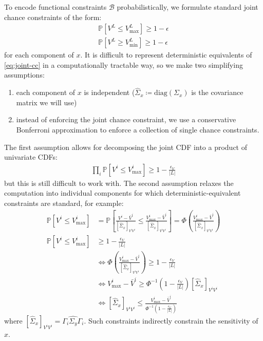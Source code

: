 To encode functional constraints $\mathcal{B}$ probabilistically, we formulate standard joint chance constraints of the form:
\begin{align}
\label{eq:joint-cc}
\mathbb{P}\left[ V^L \leq V_{\max}^L \right] \geq 1-\epsilon \\
\mathbb{P}\left[ V^L \geq V_{\min}^L \right] \geq 1-\epsilon
\end{align}
for each component of $x$.
It is difficult to represent deterministic equivalents of \cref{eq:joint-cc} in a computationally tractable way, so we make two simplifying assumptions:
\begin{enumerate}
	\item each component of $x$ is independent ($\hat{\Sigma}_x \coloneqq \text{diag}\left( \Sigma_x \right)$ is the covariance matrix we will use)
	\item instead of enforcing the joint chance constraint, we use a conservative Bonferroni approximation to enforce a collection of single chance constraints.
\end{enumerate}
The first assumption allows for decomposing the joint CDF into a product of univariate CDFs:
\begin{align}
\prod_{i} \mathbb{P} \left[ V^i \leq V_{\max}^i \right]  \geq 1 - \frac{\epsilon_V}{|L|}
\end{align}
but this is still difficult to work with.
The second assumption relaxes the computation into individual components for which deterministic-equivalent constraints are standard, for example:
\begin{subequations}
\label{eq:de}
\begin{align}
\mathbb{P} \left[ V^i \leq V_{\max}^i  \right] &= \mathbb{P} \left[ \frac{V^i - \bar{V}^i}{[\hat{\Sigma}_x]_{V^iV^i}} \leq \frac{V_{\max}^i - \bar{V}^i}{[\hat{\Sigma}_x]_{V^iV^i}} \right] = \Phi \left( \frac{V_{\max}^i - \bar{V}^i}{[\hat{\Sigma}_x]_{V^iV^i}} \right) \\
\mathbb{P} \left[ V^i \leq V_{\max}^i  \right] &\geq 1 - \frac{\epsilon_V}{|L|} \\
&\iff \Phi \left( \frac{V_{\max}^i - \bar{V}^i}{[\hat{\Sigma}_x]_{V^iV^i}} \right) \geq 1 - \frac{\epsilon_V}{|L|} \\
&\iff V_{\max}^i - \bar{V}^i \geq \Phi^{-1}\left( 1 - \frac{\epsilon_V}{|L|} \right) [\hat{\Sigma}_x]_{V^iV^i} \\
&\iff [\hat{\Sigma}_x]_{V^iV^i} \leq \frac{V_{\max}^i - \bar{V}^i}{\Phi^{-1}\left( 1 - \frac{\epsilon_V}{|L|} \right)}
\end{align}
\end{subequations}
where $[\hat{\Sigma}_x]_{V^iV^i} = \Gamma_i \hat{\Sigma_y} \Gamma_i$.
Such constraints indirectly constrain the sensitivity of $x$.

